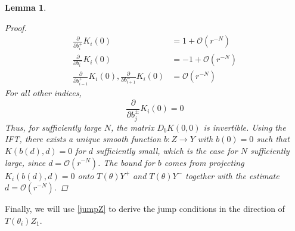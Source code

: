 \documentclass[12pt]{article}
\newtheorem{lemma}{Lemma}
\begin{document}
\begin{lemma}
\begin{proof}
\begin{align*}
\frac{\partial}{\partial b_i^+}K_i(0) &= 1 + \mathcal{O}(r^{-N})  \\
\frac{\partial}{\partial b_i^-}K_i(0) &= -1 + \mathcal{O}(r^{-N}) \\
\frac{\partial}{\partial b_{i-1}^+}K_i(0),
\frac{\partial}{\partial b_{i+1}^-}K_i(0) &= \mathcal{O}(r^{-N})
\end{align*}
For all other indices,
\[
\frac{\partial}{\partial b_j^\pm}K_i(0) = 0
\]
Thus, for sufficiently large $N$, the matrix $D_b K(0,0)$ is invertible. Using the IFT, there exists a unique smooth function $b: Z \rightarrow Y$ with $b(0) = 0$ such that $K(b(d),d) = 0$ for $d$ sufficiently small, which is the case for $N$ sufficiently large, since $d = \mathcal{O}(r^{-N})$. The bound for $b$ comes from projecting $K_i(b(d), d) = 0$ onto $T(\theta)Y^+$ and $T(\theta)Y^-$ together with the estimate $d = \mathcal{O}(r^{-N})$.
\end{proof}
\end{lemma}

Finally, we will use \eqref{jumpZ} to derive the jump conditions in the direction of $T(\theta_i) Z_1$.
\end{document}
